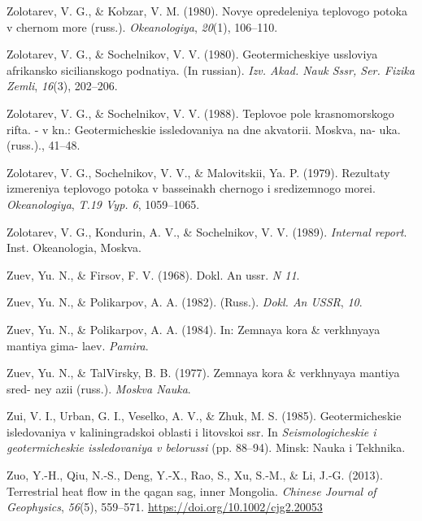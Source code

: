 \documentclass[draft,linenumbers]{agujournal2018}
\begin{document}
\leavevmode{}%
Zolotarev, V. G., \& Kobzar, V. M. (1980). Novye opredeleniya teplovogo
potoka v chernom more (russ.). \emph{Okeanologiya}, \emph{20}(1),
106--110.

\leavevmode{}%
Zolotarev, V. G., \& Sochelnikov, V. V. (1980). Geotermicheskiye
ussloviya afrikansko sicilianskogo podnatiya. (In russian). \emph{Izv.
Akad. Nauk Sssr, Ser. Fizika Zemli}, \emph{16}(3), 202--206.

\leavevmode{}%
Zolotarev, V. G., \& Sochelnikov, V. V. (1988). Teplovoe pole
krasnomorskogo rifta. - v kn.: Geotermicheskie issledovaniya na dne
akvatorii. Moskva, na- uka. (russ.)., 41--48.

\leavevmode{}%
Zolotarev, V. G., Sochelnikov, V. V., \& Malovitskii, Ya. P. (1979).
Rezultaty izmereniya teplovogo potoka v basseinakh chernogo i
sredizemnogo morei. \emph{Okeanologiya}, \emph{T.19 Vyp. 6}, 1059--1065.

\leavevmode{}%
Zolotarev, V. G., Kondurin, A. V., \& Sochelnikov, V. V. (1989).
\emph{Internal report}. Inst. Okeanologia, Moskva.

\leavevmode{}%
Zuev, Yu. N., \& Firsov, F. V. (1968). Dokl. An ussr. \emph{N 11}.

\leavevmode{}%
Zuev, Yu. N., \& Polikarpov, A. A. (1982). (Russ.). \emph{Dokl. An
USSR}, \emph{10}.

\leavevmode{}%
Zuev, Yu. N., \& Polikarpov, A. A. (1984). In: Zemnaya kora \&
verkhnyaya mantiya gima- laev. \emph{Pamira}.

\leavevmode{}%
Zuev, Yu. N., \& TalVirsky, B. B. (1977). Zemnaya kora \& verkhnyaya
mantiya sred- ney azii (russ.). \emph{Moskva Nauka}.

\leavevmode{}%
Zui, V. I., Urban, G. I., Veselko, A. V., \& Zhuk, M. S. (1985).
Geotermicheskie isledovaniya v kaliningradskoi oblasti i litovskoi ssr.
In \emph{Seismologicheskie i geotermicheskie issledovaniya v belorussi}
(pp. 88--94). Minsk: Nauka i Tekhnika.

\leavevmode{}%
Zuo, Y.-H., Qiu, N.-S., Deng, Y.-X., Rao, S., Xu, S.-M., \& Li, J.-G.
(2013). Terrestrial heat flow in the qagan sag, inner {Mongolia}.
\emph{Chinese Journal of Geophysics}, \emph{56}(5), 559--571.
\url{https://doi.org/10.1002/cjg2.20053}

\clearpage
\end{document}
